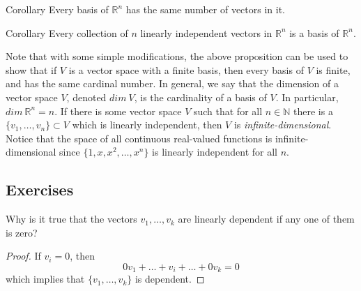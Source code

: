\begin{thm}{Corollary}
    Every basis of \( \mathbb{R}^n \) has the same number of vectors in it.
\end{thm}
\begin{thm}{Corollary}
    Every collection of \( n \) linearly independent vectors in \( \mathbb{R}^n \) is a basis of \( \mathbb{R}^n \).
\end{thm}

Note that with some simple modifications, the above proposition can be used to show that if \( V \) is a vector space with a finite basis, then every basis of \( V \) is finite, and has the same cardinal number. In general, we say that the dimension of a vector space \( V \), denoted \( dim\:V \), is the cardinality of a basis of \( V \). In particular, \( dim\: \mathbb{R}^n = n \). If there is some vector space \( V \) such that for all \( n \in \mathbb{N} \) there is a \( \{ v_1,\ldots,v_n \} \subset V \) which is linearly independent, then \( V \) is \emph{infinite-dimensional}. Notice that the space of all continuous real-valued functions is infinite-dimensional since \( \{ 1,x,x^2,\ldots,x^n \} \) is linearly independent for all \( n \).

\subsection*{Exercises}
    \question Why is it true that the vectors \( v_1,\ldots,v_k \) are linearly dependent if any one of them is zero?
    \begin{proof}
        If \( v_i = 0 \), then
        \[
        0v_1+\ldots+v_i+\ldots+0v_k = 0
        \]
        which implies that \( \{ v_1,\ldots,v_k\} \) is dependent.
    \end{proof}
    
